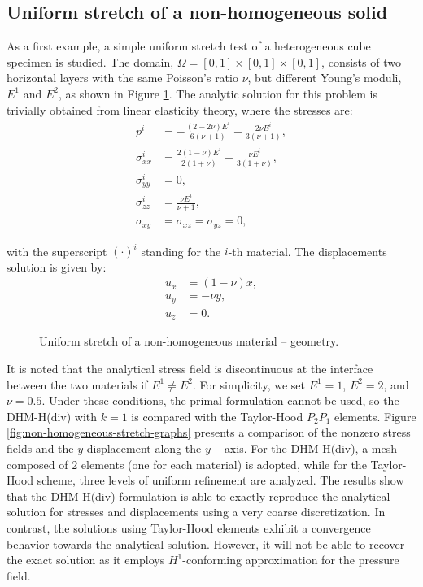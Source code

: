 \documentclass[english,11pt,3p,number,sort&compress]{elsarticle}
\begin{document}
\subsection{Uniform stretch of a non-homogeneous solid \label{subsec:non-homogeneous}}

As a first example, a simple uniform stretch test of a heterogeneous cube specimen is studied. The domain, $\Omega=[0,1] \times [0,1] \times [0,1]$, consists of two horizontal layers with the same Poisson's ratio $\nu$, but different Young's moduli, $E^1$ and $E^2$, as shown in Figure \ref{fig:non-homogeneous-stretch-geometry}. The analytic solution for this problem is trivially obtained from linear elasticity theory, where the stresses are:
\begin{equation}
	\begin{aligned}
		p^i &= -\frac{(2-2 \nu ) E^i}{6 (\nu +1)}-\frac{2 \nu 
		E^i}{3 (\nu +1)}, \\
		\sigma^i_{xx} &= \frac{2(1-\nu)E^i}{2(1+\nu)}-\frac{\nu E^i}{3(1+\nu)}, \\
		\sigma^i_{yy} &= 0, \\
		\sigma^i_{zz} &= \frac{\nu E^i}{\nu +1}, \\
		\sigma_{xy} &= \sigma_{xz} = \sigma_{yz} = 0,
	\end{aligned}
\end{equation}

\noindent with the superscript $(\cdot)^i$ standing for the $i$-th material. The displacements solution is given by:
\begin{equation}
	\begin{aligned}
		u_x &= (1-\nu)x, \\
		u_y &= -\nu y, \\
		u_z &= 0.
	\end{aligned}
\end{equation}

\begin{figure}[!htb]
    \centering
    
    \caption{Uniform stretch of a non-homogeneous material -- geometry.}
    \label{fig:non-homogeneous-stretch-geometry}
\end{figure}

It is noted that the analytical stress field is discontinuous at the interface between the two materials if $E^1 \neq E^2$. For simplicity, we set $E^1=1$, $E^2=2$, and $\nu=0.5$. Under these conditions, the primal formulation cannot be used, so the DHM-H(div) with $k=1$ is compared with the Taylor-Hood $P_2P_1$ elements. Figure \ref{fig:non-homogeneous-stretch-graphs} presents a comparison of the nonzero stress fields and the $y$ displacement along the $y-$axis. For the DHM-H(div), a mesh composed of $2$ elements (one for each material) is adopted, while for the Taylor-Hood scheme, three levels of uniform refinement are analyzed. The results show that the DHM-H(div) formulation is able to exactly reproduce the analytical solution for stresses and displacements using a very coarse discretization. In contrast, the solutions using Taylor-Hood elements exhibit a convergence behavior towards the analytical solution. However, it will not be able to recover the exact solution as it employs $H^1$-conforming approximation for the pressure field.
\end{document}
